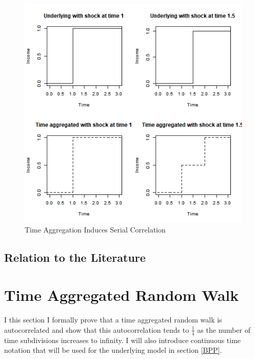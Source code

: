 \documentclass[titlepage]{\econtex}\newcommand{\texname}{BPP_TimeAgg}
\begin{document}
\begin{figure}
	\caption{Time Aggregation Induces Serial Correlation}
	\label{fig:TimeAggExample}
	\includegraphics[width=1\textwidth]{../Code/Figures/TimeAggExample.png}
\end{figure}

\subsection{Relation to the Literature}

\section{Time Aggregated Random Walk} \label{TimeAggRandomWalk}
I this section I formally prove that a time aggregated random walk is autocorrelated and show that this autocorrelation tends to $\frac{1}{4}$ as the number of time subdivisions increases to infinity. I will also introduce continuous time notation that will be used for the underlying model in section \ref{BPP}.
\end{document}
